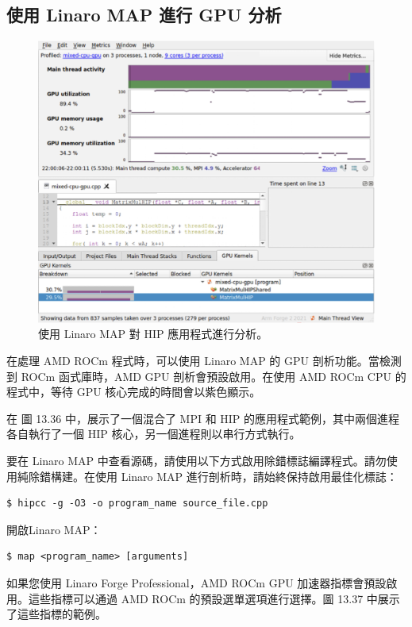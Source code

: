 \subsection{使用 Linaro MAP 進行 GPU 分析}

\begin{figure}
    \centering
    \includegraphics[width=0.9\linewidth]{FileAusiliari/Screenshots/Figure13-36.png}
    \caption{使用 Linaro MAP 對 HIP 應用程式進行分析。}
    \label{fig:PAPI36}
\end{figure}

在處理 AMD ROCm 程式時，可以使用 Linaro MAP 的 GPU 剖析功能。當檢測到 ROCm 函式庫時，AMD GPU 剖析會預設啟用。在使用 AMD ROCm CPU 的程式中，等待 GPU 核心完成的時間會以紫色顯示。

在 圖 13.36 中，展示了一個混合了 MPI 和 HIP 的應用程式範例，其中兩個進程各自執行了一個 HIP 核心，另一個進程則以串行方式執行。

要在 Linaro MAP 中查看源碼，請使用以下方式啟用除錯標誌編譯程式。請勿使用純除錯構建。在使用 Linaro MAP 進行剖析時，請始終保持啟用最佳化標誌：

\begin{lstlisting}
$ hipcc -g -O3 -o program_name source_file.cpp
\end{lstlisting}

開啟Linaro MAP：
\begin{lstlisting}
$ map <program_name> [arguments]
\end{lstlisting}

如果您使用 Linaro Forge Professional，AMD ROCm GPU 加速器指標會預設啟用。這些指標可以通過 AMD ROCm 的預設選單選項進行選擇。圖 13.37 中展示了這些指標的範例。

